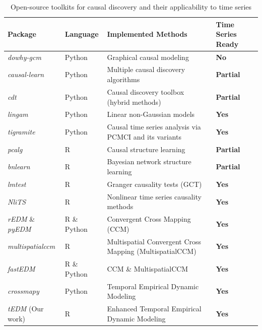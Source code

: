 \documentclass[authoryear,preprint,review,12pt]{elsarticle}
\begin{document}
\begin{table}[htb!]
\centering
\caption{Open-source toolkits for causal discovery and their applicability to time series}
\label{tab_toolkits}
\renewcommand{\arraystretch}{1.3}
\begin{tabular}{| p{3.2cm} | p{2.8cm} | p{7.2cm} | p{2.5cm} |}
\hline
\textbf{Package} & \textbf{Language} & \textbf{Implemented Methods} & \textbf{Time Series Ready} \\
\hline
\textit{dowhy-gcm}       & Python           & Graphical causal modeling & \textbf{No} \\
\textit{causal-learn}    & Python           & Multiple causal discovery algorithms            & \textbf{Partial} \\
\textit{cdt}             & Python           & Causal discovery toolbox (hybrid methods)            & \textbf{Partial} \\
\textit{lingam}          & Python           & Linear non-Gaussian models      & \textbf{Yes} \\
\textit{tigramite}       & Python           & Causal time series analysis via PCMCI and its variants     & \textbf{Yes} \\
\textit{pcalg}           & R                & Causal structure learning                & \textbf{Partial} \\
\textit{bnlearn}         & R                & Bayesian network structure learning                  & \textbf{Partial} \\
\textit{lmtest}          & R                & Granger causality tests  (GCT)                             & \textbf{Yes} \\
\textit{NliTS}           & R                & Nonlinear time series causality methods              & \textbf{Yes} \\
\textit{rEDM} \& \textit{pyEDM}     & R \& Python                 & Convergent Cross Mapping (CCM)             & \textbf{Yes} \\
\textit{multispatialccm} & R                & Multispatial Convergent Cross Mapping (MultispatialCCM)                  & \textbf{Yes} \\
\textit{fastEDM}         & R \& Python      &   CCM \& MultispatialCCM                          & \textbf{Yes} \\
\textit{crossmapy}       & Python           & Temporal Empirical Dynamic Modeling      & \textbf{Yes} \\
\textit{tEDM} (Our work)       & R          & Enhanced Temporal Empirical Dynamic Modeling                           & \textbf{Yes} \\
\hline
\end{tabular}
\end{table}
\end{document}
